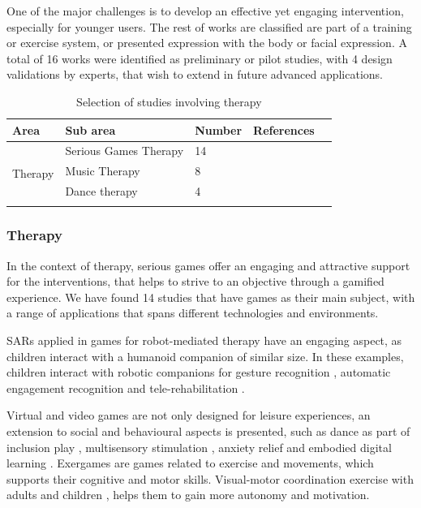 \documentclass[a4paper,fleqn]{cas-sc}
\begin{document}
One of the major challenges is to develop an effective yet engaging intervention, especially for younger users. The rest of works are classified are part of a training or exercise system, or presented expression with the body or facial expression. A total of 16 works were identified as preliminary or pilot studies, with 4 design validations by experts, that wish to extend in future advanced applications.


\begin{table}[h]
\centering
\begin{tabular*}{6.2in}{p{0.7in}|p{0.85in}|p{0.36in}|p{3.5in}p{0in}}
\hline
Area   & Sub area   & Number & References  &  \\ \hline
\multirow{5}{*}{\centering Therapy}
    & Serious Games Therapy & 14 & \cite{Raygoza-Romero21, DeCarolis21, Simeoli20, Telisheva20,  Rosly20, Martinez-Mones19, Wasserman19, Ruiz-Rodriguez19, Ardalan19, Crowell18, AltizerJr18, Caro18, Sharma18, Castelhano17}
    &  \\\cline{2-4}
    & Music Therapy  & 8 & \cite{Ragone22, Mcgowan21, Ma21, Ragone20, Vargas20, Ragone20OS, Yi-Hsiang18, McGowan17} &  \\
    \cline{2-4} 
    & Dance therapy & 4 & \cite{Brown22, Trajkova20, Ringland19, Suzuki17} &  \\
     \cline{1-4}
\end{tabular*}
\caption{Selection of studies involving therapy}
\label{TABLE:area-therapy}
\end{table}

\subsubsection{Therapy}
\label{sec:app-contexts-therapy}
In the context of therapy, serious games offer an engaging and attractive support for the interventions, that helps to strive to an objective through a gamified experience. We have found 14 studies that have games as their main subject, with a range of applications that spans different technologies and environments.

SARs applied in games for robot-mediated therapy have an engaging aspect, as children interact with a humanoid companion of similar size. In these examples, children interact with robotic companions for gesture recognition \cite{DeCarolis21}, automatic engagement recognition \cite{Telisheva20} and tele-rehabilitation \cite{Rosly20}.

Virtual and video games are not only designed for leisure experiences, an extension to social and behavioural aspects is presented, such as dance as part of inclusion play \cite{Wasserman19}, multisensory stimulation \cite{Castelhano17}, anxiety relief\cite{AltizerJr18} and embodied digital learning \cite{Martinez-Mones19}. Exergames are games related to exercise and movements, which supports their cognitive and motor skills. Visual-motor coordination exercise with adults \cite{Caro18} and children \cite{Raygoza-Romero21}, helps them to gain more autonomy and motivation.
\end{document}
